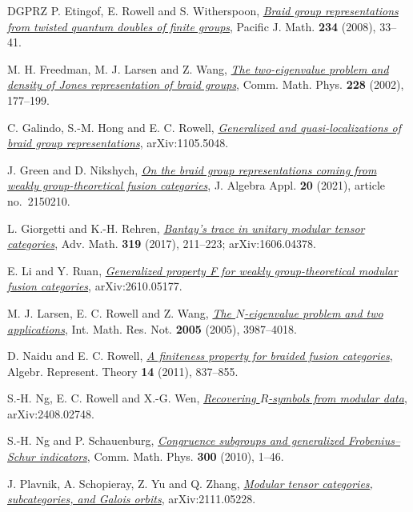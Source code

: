 \documentclass[11pt,oneside]{amsart}
\theoremstyle{remark}
\begin{document}
\begin{thebibliography}{DGPRZ}
P. Etingof, E. Rowell and S. Witherspoon,
\href{https://arxiv.org/abs/math/0703274}{\emph{Braid group representations from twisted quantum doubles of finite groups}},
Pacific J. Math. \textbf{234} (2008), 33--41.

M. H. Freedman, M. J. Larsen and Z. Wang,
\href{https://arxiv.org/abs/math/0103200}{\emph{The two-eigenvalue problem and density of Jones representation of braid groups}},
Comm. Math. Phys. \textbf{228} (2002), 177--199.

C. Galindo, S.-M. Hong and E. C. Rowell,
\href{https://arxiv.org/abs/1105.5048}{\emph{Generalized and quasi-localizations of braid group representations}},
arXiv:1105.5048.

J. Green and D. Nikshych,
\href{https://arxiv.org/abs/1911.02633}{\emph{On the braid group representations coming from weakly group-theoretical
fusion categories}},
J. Algebra Appl. \textbf{20} (2021), article no.~2150210.

L. Giorgetti and K.-H. Rehren,
\href{https://arxiv.org/abs/1606.04378}{\emph{Bantay's trace in unitary modular tensor categories}},
Adv. Math. \textbf{319} (2017), 211--223; arXiv:1606.04378.

E. Li and Y. Ruan,
\href{https://arxiv.org/abs/2610.05177}{\emph{Generalized property F for weakly group-theoretical modular fusion categories}},
arXiv:2610.05177.

M. J. Larsen, E. C. Rowell and Z. Wang,
\href{https://arxiv.org/abs/math/0506025}{\emph{The $N$-eigenvalue problem and two applications}},
Int. Math. Res. Not. \textbf{2005} (2005), 3987--4018.

D. Naidu and E. C. Rowell,
\href{https://arxiv.org/abs/0903.4157}{\emph{A finiteness property for braided fusion categories}},
Algebr. Represent. Theory \textbf{14} (2011), 837--855.

S.-H. Ng, E. C. Rowell and X.-G. Wen,
\href{https://arxiv.org/abs/2408.02748}{\emph{Recovering $R$-symbols from modular data}},
arXiv:2408.02748.

S.-H. Ng and P. Schauenburg,
\href{https://arxiv.org/abs/0806.2493}{\emph{Congruence subgroups and generalized Frobenius--Schur indicators}},
Comm. Math. Phys. \textbf{300} (2010), 1--46.

J. Plavnik, A. Schopieray, Z. Yu and Q. Zhang,
\href{https://arxiv.org/abs/2111.05228}{\emph{Modular tensor categories, subcategories, and Galois orbits}},
arXiv:2111.05228.


\end{thebibliography}
\end{document}
